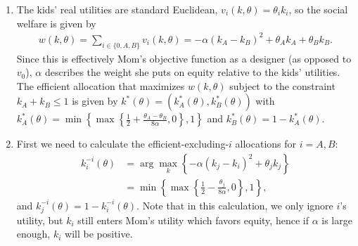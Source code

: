 \documentclass[a4paper]{article}
\begin{document}
\begin{enumerate}
	\item The kids' real utilities are standard Euclidean, $v_i(k,\theta) = \theta_i k_i$, so the social welfare is given by 
	\begin{align*}
		w(k,\theta) = \sum_{i \in \{0,A,B\}} v_i(k,\theta) = -\alpha(k_A - k_B)^2 + \theta_A k_A + \theta_B k_B.
	\end{align*}
	Since this is effectively Mom's objective function as a designer (as opposed to $v_0$), $\alpha$ describes the weight she puts on equity relative to the kids' utilities. The efficient allocation that maximizes $w(k,\theta)$ subject to the constraint $k_A+k_B \leq 1$ is given by $k^*(\theta)=(k^*_A(\theta),k^*_B(\theta))$ with $k^*_A(\theta) = \min \left\{ \max \left\{ \frac{1}{2} + \frac{\theta_A - \theta_B}{8 \alpha}, 0 \right\}, 1 \right\}$  and $k^*_B(\theta) = 1 - k^*_A(\theta)$. 
	
	\item First we need to calculate the efficient-excluding-$i$ allocations for $i=A,B$:
	\begin{align*}
		k^{-i}_i(\theta) &= \arg \max_k \left\{ -\alpha(k_j - k_i)^2 + \theta_j k_j \right\}
		\\
		&= \min \left\{ \max \left\{ \frac{1}{2} - \frac{\theta_j}{8 \alpha}, 0 \right\}, 1 \right\},
	\end{align*}
	and $k^{-i}_j(\theta) = 1 - k^{-i}_i(\theta)$. Note that in this calculation, we only ignore $i$'s utility, but $k_i$ still enters Mom's utility which favors equity, hence if $\alpha$ is large enough, $k_i$ will be positive.
	

\end{enumerate}
\end{document}

